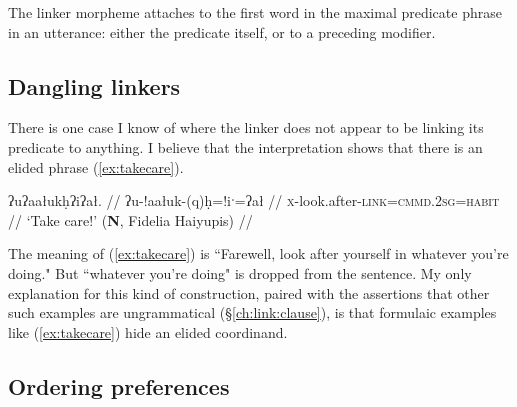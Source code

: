 The linker morpheme attaches to the first word in the maximal predicate phrase in an utterance: either the predicate itself, or to a preceding modifier.


\subsection{Dangling linkers} \label{ch:link:dangling}

There is one case I know of where the linker does not appear to be linking its predicate to anything. I believe that the interpretation shows that there is an elided phrase (\ref{ex:takecare}).

\ex \label{ex:takecare}
\begingl
\glpreamble ʔuʔaałukḥʔiʔał.\footnotemark{} //
\gla ʔu-!aałuk-(q)ḥ=!iˑ=ʔał //
\glb \textsc{x}-look.after-\textsc{link}=\textsc{cmmd.2sg}=\textsc{habit} //
\glft `Take care!' (\textbf{N}, Fidelia Haiyupis) //
\endgl
\xe


The meaning of (\ref{ex:takecare}) is ``Farewell, look after yourself in whatever you're doing." But ``whatever you're doing" is dropped from the sentence. My only explanation for this kind of construction, paired with the assertions that other such examples are ungrammatical (\S\ref{ch:link:clause}), is that formulaic examples like (\ref{ex:takecare}) hide an elided coordinand. %

\subsection{Ordering preferences} \label{ch:link:preferences}

